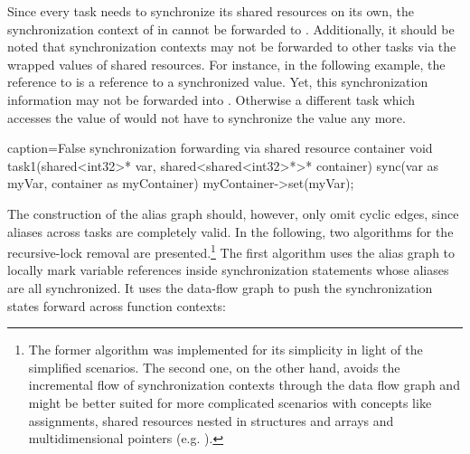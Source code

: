 Since every task needs to synchronize its shared resources on its own, the synchronization context of  in  cannot be forwarded to . Additionally, it should be noted that synchronization contexts may not be forwarded to other tasks via the wrapped values of shared resources. For instance, in the following example, the reference to  is a reference to a synchronized value. Yet, this synchronization information may not be forwarded into . Otherwise a different task which accesses the value of  would not have to synchronize the value any more.

\begin{ccode}{caption=False synchronization forwarding via shared resource container}
void task1(shared<int32>* var, shared<shared<int32>*>* container) {
  sync(var as myVar, container as myContainer) {
    myContainer->set(myVar);
  }
}
\end{ccode}

The construction of the alias graph should, however, only omit cyclic edges, since aliases across tasks are completely valid. In the following, two algorithms for the recursive-lock removal are presented.\footnote{The former algorithm was implemented for its simplicity in light of the simplified scenarios. The second one, on the other hand, avoids the incremental flow of synchronization contexts through the data flow graph and might be better suited for more complicated scenarios with concepts like assignments, shared resources nested in structures and arrays and multidimensional pointers (e.g. ).} The first algorithm uses the alias graph to locally mark variable references inside synchronization statements whose aliases are all synchronized. It uses the data-flow graph to push the synchronization states forward across function contexts:

\vspace{4mm}

